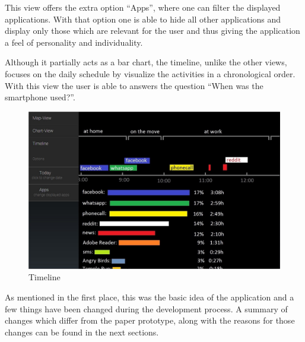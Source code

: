 This  view offers the extra option ``Apps'', where one can filter the displayed applications. With that option one is able to hide all other applications and display only those which are relevant for the user and thus giving the application a feel of personality and individuality.

Although it partially acts as a bar chart, the timeline, unlike the other views, focuses on the daily schedule by visualize the activities in a chronological order. With this view the user is able to answers the question ``When was the smartphone used?''.
\begin{figure}[h]
	\caption{Timeline}
	\label{img:timeline}
	\includegraphics[width=\textwidth]{images/Design/3_TimeLine.jpg}
\end{figure}

As mentioned in the first place, this was the basic idea of the application and a few things have been changed during the development process. A summary of changes which differ from the paper prototype, along with the reasons for those changes can be found in the next sections.

